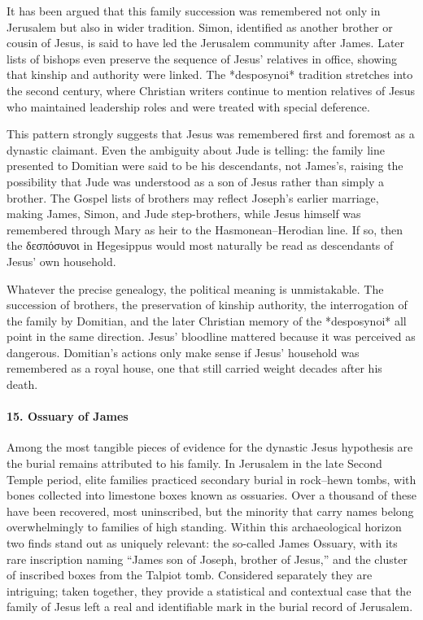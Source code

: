 It has been argued that this family succession was remembered not only in Jerusalem but also in wider tradition.
Simon, identified as another brother or cousin of Jesus, is said to have led the Jerusalem community after James.
Later lists of bishops even preserve the sequence of Jesus’ relatives in office, showing that kinship and authority were linked.
The *desposynoi* tradition stretches into the second century, where Christian writers continue to mention relatives of Jesus who maintained leadership roles and were treated with special deference.

This pattern strongly suggests that Jesus was remembered first and foremost as a dynastic claimant.
Even the ambiguity about Jude is telling: the family line presented to Domitian were said to be his descendants, not James’s, raising the possibility that Jude was understood as a son of Jesus rather than simply a brother.
The Gospel lists of brothers may reflect Joseph’s earlier marriage, making James, Simon, and Jude step-brothers, while Jesus himself was remembered through Mary as heir to the Hasmonean–Herodian line.
If so, then the δεσπόσυνοι in Hegesippus would most naturally be read as descendants of Jesus’ own household.

Whatever the precise genealogy, the political meaning is unmistakable.
The succession of brothers, the preservation of kinship authority, the interrogation of the family by Domitian, and the later Christian memory of the *desposynoi* all point in the same direction.
Jesus’ bloodline mattered because it was perceived as dangerous.
Domitian’s actions only make sense if Jesus’ household was remembered as a royal house, one that still carried weight decades after his death.

\paragraph{15.
Ossuary of James}\label{par:ossuary-of-james}

Among the most tangible pieces of evidence for the dynastic Jesus hypothesis are the burial remains attributed to his family.
In Jerusalem in the late Second Temple period, elite families practiced secondary burial in rock–hewn tombs, with bones collected into limestone boxes known as ossuaries.
Over a thousand of these have been recovered, most uninscribed, but the minority that carry names belong overwhelmingly to families of high standing.
Within this archaeological horizon two finds stand out as uniquely relevant: the so-called James Ossuary, with its rare inscription naming “James son of Joseph, brother of Jesus,” and the cluster of inscribed boxes from the Talpiot tomb.
Considered separately they are intriguing; taken together, they provide a statistical and contextual case that the family of Jesus left a real and identifiable mark in the burial record of Jerusalem.

